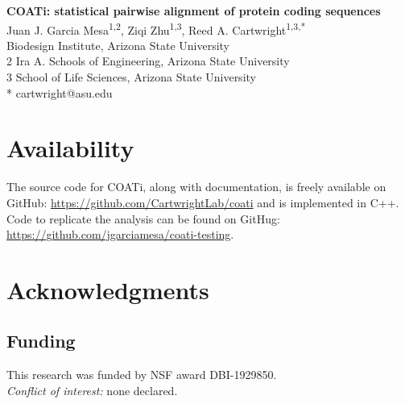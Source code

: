 



\begin{flushleft}
{\Large\textbf{COATi: statistical pairwise alignment of protein coding sequences}}
\newline
\\
Juan J. Garcia Mesa\textsuperscript{1,2},
Ziqi Zhu\textsuperscript{1,3},
Reed A. Cartwright\textsuperscript{1,3,*}
\\
 Biodesign Institute, Arizona State University
\\
2 Ira A. Schools of Engineering, Arizona State University
\\
3 School of Life Sciences, Arizona State University
\\
\bigskip
* cartwright@asu.edu

\end{flushleft}



\linenumbers







\section*{Availability}
The source code for COATi, along with documentation, is
freely available on GitHub: \url{https://github.com/CartwrightLab/coati} and is
implemented in C++.
Code to replicate the analysis can be found on GitHug: \url{https://github.com/jgarciamesa/coati-testing}.


\section*{Acknowledgments}



\subsection*{Funding}
This research was funded by NSF award DBI-1929850.\\

\noindent \textit{Conflict of interest:} none declared.


\printbibliography

\nolinenumbers


